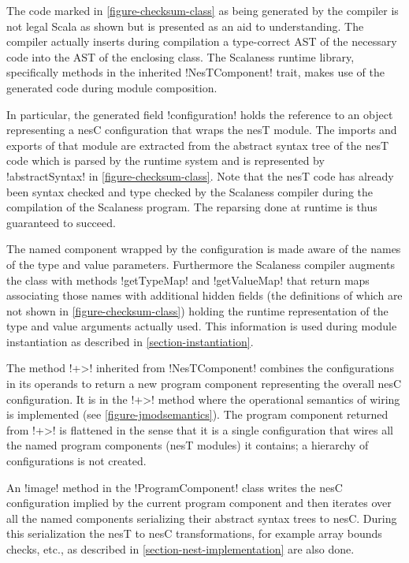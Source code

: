 The code marked in \autoref{figure-checksum-class} as being generated by the compiler is not
legal Scala as shown but is presented as an aid to understanding. The compiler actually inserts
during compilation a type-correct AST of the necessary code into the AST of the enclosing
class. The Scalaness runtime library, specifically methods in the inherited !NesTComponent!
trait, makes use of the generated code during module composition.

In particular, the generated field !configuration! holds the reference to an object representing
a nesC configuration that wraps the nesT module. The imports and exports of that module are
extracted from the abstract syntax tree of the nesT code which is parsed by the runtime system
and is represented by !abstractSyntax! in \autoref{figure-checksum-class}. Note that the nesT
code has already been syntax checked and type checked by the Scalaness compiler during the
compilation of the Scalaness program. The reparsing done at runtime is thus guaranteed to
succeed.

The named component wrapped by the configuration is made aware of the names of the type and
value parameters. Furthermore the Scalaness compiler augments the class with methods
!getTypeMap! and !getValueMap! that return maps associating those names with additional hidden
fields (the definitions of which are not shown in \autoref{figure-checksum-class}) holding the
runtime representation of the type and value arguments actually used. This information is used
during module instantiation as described in \autoref{section-instantiation}.

The method !+>! inherited from !NesTComponent! combines the configurations in its operands to
return a new program component representing the overall nesC configuration. It is in the !+>!
method where the operational semantics of wiring is implemented (see
\autoref{figure-jmodsemantics}). The program component returned from !+>! is flattened in the
sense that it is a single configuration that wires all the named program components (nesT
modules) it contains; a hierarchy of configurations is not created.

An !image! method in the !ProgramComponent! class writes the nesC configuration implied by the
current program component and then iterates over all the named components serializing their
abstract syntax trees to nesC. During this serialization the nesT to nesC transformations, for
example array bounds checks, etc., as described in \autoref{section-nest-implementation} are
also done.

